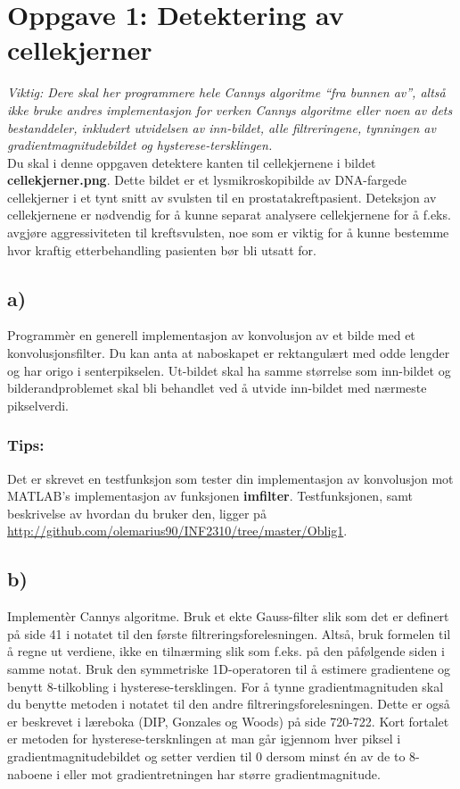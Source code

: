 \documentclass[11pt,a4paper]{article}
\begin{document}
\newpage

\section*{Oppgave 1: Detektering av cellekjerner}
\textit{Viktig: Dere skal her programmere hele Cannys algoritme “fra bunnen av”, altså
ikke bruke andres implementasjon for verken Cannys algoritme eller noen av dets
bestanddeler, inkludert utvidelsen av inn-bildet, alle filtreringene, tynningen av
gradientmagnitudebildet og hysterese-tersklingen.}
\\

Du skal i denne oppgaven detektere kanten til cellekjernene i bildet \\\textbf{cellekjerner.png}.
Dette bildet er et lysmikroskopibilde av DNA-fargede cellekjerner i et tynt snitt av
svulsten til en prostatakreftpasient. Deteksjon av cellekjernene er nødvendig for å
kunne separat analysere cellekjernene for å f.eks. avgjøre aggressiviteten til
kreftsvulsten, noe som er viktig for å kunne bestemme hvor kraftig etterbehandling
pasienten bør bli utsatt for.
\subsection*{a)}
Programmèr en generell implementasjon av konvolusjon av et bilde med et
konvolusjonsfilter. Du kan anta at naboskapet er rektangulært med odde
lengder og har origo i senterpikselen. Ut-bildet skal ha samme størrelse som
inn-bildet og bilderandproblemet skal bli behandlet ved å utvide inn-bildet med
nærmeste pikselverdi.
\subsubsection*{Tips:}
Det er skrevet en testfunksjon som tester din implementasjon av konvolusjon mot MATLAB's implementasjon av funksjonen
\textbf{imfilter}. Testfunksjonen, samt beskrivelse av hvordan du bruker den, ligger på \\
\href{http://github.com/olemarius90/INF2310/tree/master/Oblig1}{http://github.com/olemarius90/INF2310/tree/master/Oblig1}.

\subsection*{b)} 
Implementèr Cannys algoritme. Bruk et ekte Gauss-filter slik som det er
definert på side 41 i notatet til den første filtreringsforelesningen. Altså, bruk formelen
til å regne ut verdiene, ikke en tilnærming slik som f.eks. på den påfølgende siden i samme
notat. Bruk den symmetriske 1D-operatoren til å estimere gradientene og benytt 8-tilkobling i
hysterese-tersklingen. For å tynne gradientmagnituden skal du benytte metoden
i notatet til den andre filtreringsforelesningen. Dette er også er beskrevet i
læreboka (DIP, Gonzales og Woods) på side 720-722. Kort fortalet er metoden for hysterese-tersknlingen
at man går igjennom hver piksel i gradientmagnitudebildet og setter verdien til 0 dersom minst én av 
de to 8-naboene i eller mot gradientretningen har større gradientmagnitude.
\end{document}
